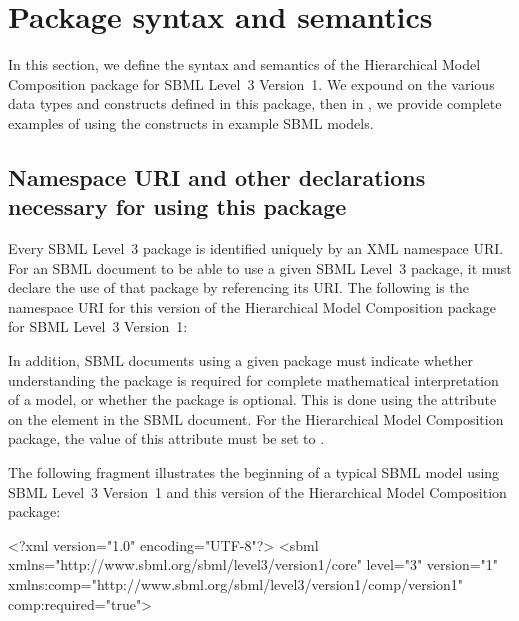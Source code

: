 
\newcommand{\fixttspace}{\hspace*{1pt}}

\section{Package syntax and semantics}
\label{sec:syntax}

In this section, we define the syntax and semantics of the Hierarchical
Model Composition package for SBML Level~3 Version~1.  We expound on the
various data types and constructs defined in this package, then in
, we provide complete examples of using the constructs in
example SBML models.

\subsection{Namespace URI and other declarations necessary for using this package}
\label{xml-namespace}

Every SBML Level~3 package is identified uniquely by an XML namespace
URI.  For an SBML document to be able to use a given SBML Level~3
package, it must declare the use of that package by referencing its URI.
The following is the namespace URI for this version of the Hierarchical
Model Composition package for SBML Level~3 Version~1:
\begin{center}
\end{center}

In addition, SBML documents using a given package must indicate whether
understanding the package is required for complete mathematical
interpretation of a model, or whether the package is optional.  This is
done using the attribute  on the  element
in the SBML document.  For the Hierarchical Model Composition package,
the value of this attribute must be set to .

The following fragment illustrates the beginning of a typical SBML model
using SBML Level~3 Version~1 and this version of the Hierarchical Model
Composition package:

\begin{example}
<?xml version="1.0" encoding="UTF-8"?>
<sbml xmlns="http://www.sbml.org/sbml/level3/version1/core" level="3" version="1"
      xmlns:comp="http://www.sbml.org/sbml/level3/version1/comp/version1" comp:required="true">
\end{example}
    

